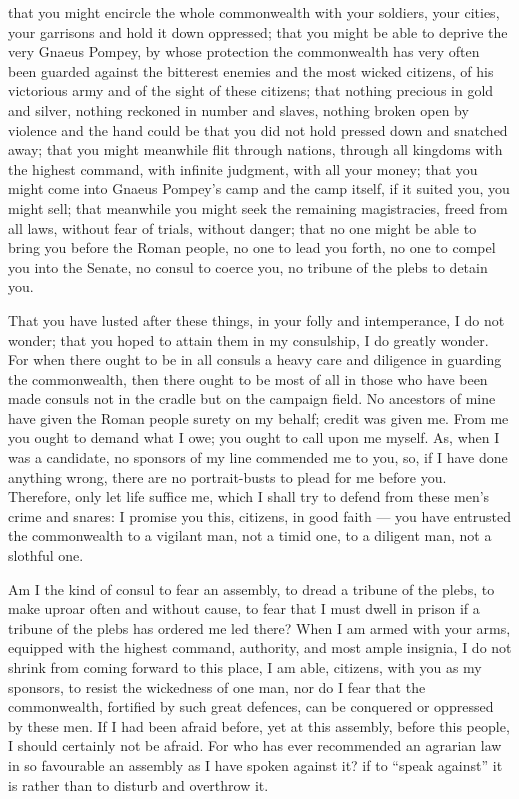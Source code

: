  that you might encircle the whole commonwealth with your soldiers, your cities, your garrisons and hold it down oppressed; that you might be able to deprive the very Gnaeus Pompey, by whose protection the commonwealth has very often been guarded against the bitterest enemies and the most wicked citizens, of his victorious army and of the sight of these citizens; that nothing precious in gold and silver, nothing reckoned in number and slaves, nothing broken open by violence and the hand could be that you did not hold pressed down and snatched away; that you might meanwhile flit through nations, through all kingdoms with the highest command, with infinite judgment, with all your money; that you might come into Gnaeus Pompey's camp and the camp itself, if it suited you, you might sell; that meanwhile you might seek the remaining magistracies, freed from all laws, without fear of trials, without danger; that no one might be able to bring you before the Roman people, no one to lead you forth, no one to compel you into the Senate, no consul to coerce you, no tribune of the plebs to detain you.

 That you have lusted after these things, in your folly and intemperance, I do not wonder; that you hoped to attain them in my consulship, I do greatly wonder. For when there ought to be in all consuls a heavy care and diligence in guarding the commonwealth, then there ought to be most of all in those who have been made consuls not in the cradle but on the campaign field. No ancestors of mine have given the Roman people surety on my behalf; credit was given me. From me you ought to demand what I owe; you ought to call upon me myself. As, when I was a candidate, no sponsors of my line commended me to you, so, if I have done anything wrong, there are no portrait-busts to plead for me before you. Therefore, only let life suffice me, which I shall try to defend from these men's crime and snares: I promise you this, citizens, in good faith --- you have entrusted the commonwealth to a vigilant man, not a timid one, to a diligent man, not a slothful one.

 Am I the kind of consul to fear an assembly, to dread a tribune of the plebs, to make uproar often and without cause, to fear that I must dwell in prison if a tribune of the plebs has ordered me led there? When I am armed with your arms, equipped with the highest command, authority, and most ample insignia, I do not shrink from coming forward to this place, I am able, citizens, with you as my sponsors, to resist the wickedness of one man, nor do I fear that the commonwealth, fortified by such great defences, can be conquered or oppressed by these men. If I had been afraid before, yet at this assembly, before this people, I should certainly not be afraid. For who has ever recommended an agrarian law in so favourable an assembly as I have spoken against it? if to ``speak against'' it is rather than to disturb and overthrow it.

